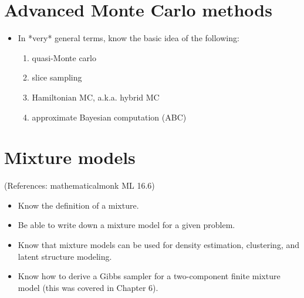 \documentclass[12pt]{article}
\begin{document}
\section{Advanced Monte Carlo methods}
\begin{itemize}
\setlength\itemsep{0em}
\item In *very* general terms, know the basic idea of the following:
    \begin{enumerate}
        \item quasi-Monte carlo
        \item slice sampling
        \item Hamiltonian MC, a.k.a. hybrid MC
        \item approximate Bayesian computation (ABC)
    \end{enumerate}
\end{itemize}




\section{Mixture models}
(References: mathematicalmonk ML 16.6)
\begin{itemize}
\setlength\itemsep{0em}
\item Know the definition of a mixture.
\item Be able to write down a mixture model for a given problem.
\item Know that mixture models can be used for density estimation, clustering, and latent structure modeling.
\item Know how to derive a Gibbs sampler for a two-component finite mixture model (this was covered in Chapter 6).
\end{itemize}














  
\end{document}
